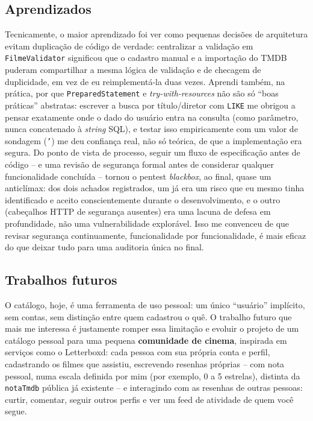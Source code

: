 \documentclass[12pt,a4paper]{article}
\begin{document}
\subsection{Aprendizados}

Tecnicamente, o maior aprendizado foi ver como pequenas decisões de arquitetura evitam
duplicação de código de verdade: centralizar a validação em \texttt{FilmeValidator} significou
que o cadastro manual e a importação do TMDB puderam compartilhar a mesma lógica de validação e
de checagem de duplicidade, em vez de eu reimplementá-la duas vezes. Aprendi também, na prática,
por que \texttt{PreparedStatement} e \textit{try-with-resources} não são só ``boas práticas''
abstratas: escrever a busca por título/diretor com \texttt{LIKE} me obrigou a pensar exatamente
onde o dado do usuário entra na consulta (como parâmetro, nunca concatenado à \textit{string}
SQL), e testar isso empiricamente com um valor de sondagem (\texttt{'}) me deu confiança real, não
só teórica, de que a implementação era segura. Do ponto de vista de processo, seguir um fluxo de
especificação antes de código -- e uma revisão de segurança formal antes de considerar qualquer
funcionalidade concluída -- tornou o pentest \textit{blackbox}, ao final, quase um anticlímax:
dos dois achados registrados, um já era um risco que eu mesmo tinha identificado e aceito
conscientemente durante o desenvolvimento, e o outro (cabeçalhos HTTP de segurança ausentes) era
uma lacuna de defesa em profundidade, não uma vulnerabilidade explorável. Isso me convenceu de
que revisar segurança continuamente, funcionalidade por funcionalidade, é mais eficaz do que
deixar tudo para uma auditoria única no final.

\subsection{Trabalhos futuros}

O catálogo, hoje, é uma ferramenta de uso pessoal: um único ``usuário'' implícito, sem contas,
sem distinção entre quem cadastrou o quê. O trabalho futuro que mais me interessa é justamente
romper essa limitação e evoluir o projeto de um catálogo pessoal para uma pequena
\textbf{comunidade de cinema}, inspirada em serviços como o Letterboxd: cada pessoa com sua
própria conta e perfil, cadastrando os filmes que assistiu, escrevendo resenhas próprias -- com
nota pessoal, numa escala definida por mim (por exemplo, 0 a 5 estrelas), distinta da
\texttt{notaTmdb} pública já existente -- e interagindo com as resenhas de outras pessoas: curtir,
comentar, seguir outros perfis e ver um feed de atividade de quem você segue.
\end{document}
